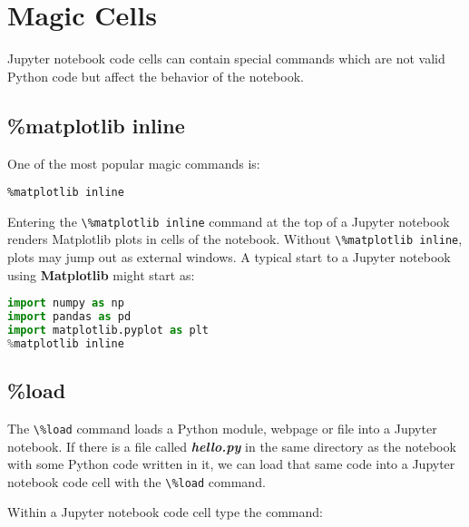 \documentclass{book}
\newcommand{\passthrough}[1]{#1}
\begin{document}
    
        \hypertarget{magic-cells}{%
\section{Magic Cells}\label{magic-cells}}
    




    
        Jupyter notebook code cells can contain special commands which are not
valid Python code but affect the behavior of the notebook.
    




    
        \hypertarget{matplotlib-inline}{%
\subsection{\%matplotlib inline}\label{matplotlib-inline}}

One of the most popular magic commands is:

\begin{lstlisting}
%matplotlib inline
\end{lstlisting}

Entering the \passthrough{\lstinline!\%matplotlib inline!} command at
the top of a Jupyter notebook renders Matplotlib plots in cells of the
notebook. Without \passthrough{\lstinline!\%matplotlib inline!}, plots
may jump out as external windows. A typical start to a Jupyter notebook
using \textbf{Matplotlib} might start as:

\begin{lstlisting}[language=Python]
import numpy as np
import pandas as pd
import matplotlib.pyplot as plt
%matplotlib inline
\end{lstlisting}
    




    
        \hypertarget{load}{%
\subsection{\%load}\label{load}}

The \passthrough{\lstinline!\%load!} command loads a Python module,
webpage or file into a Jupyter notebook. If there is a file called
\textbf{\emph{hello.py}} in the same directory as the notebook with some
Python code written in it, we can load that same code into a Jupyter
notebook code cell with the \passthrough{\lstinline!\%load!} command.

Within a Jupyter notebook code cell type the command:
\end{document}
